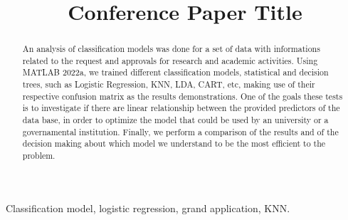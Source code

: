 \documentclass[conference]{IEEEtran}
\begin{document}
\title{Conference Paper Title}

\author{
\and
{}
}

\maketitle

\begin{abstract}
An analysis of classification models was done for a set of data with informations related to the request and approvals for research and academic activities. Using MATLAB 2022a, we trained different classification models, statistical and decision trees, such as Logistic Regression, KNN, LDA, CART, etc, making use of their respective confusion matrix as the results demonstrations. One of the goals these tests is to investigate if there are linear relationship between the provided predictors of the data base, in order to optimize the model that could be used by an university or a governamental institution. Finally, we perform a comparison of the results and of the decision making about which model we understand to be the most efficient to the problem.  
\end{abstract}

\begin{IEEEkeywords}
Classification model, logistic regression, grand application, KNN.
\end{IEEEkeywords}











\end{document}
